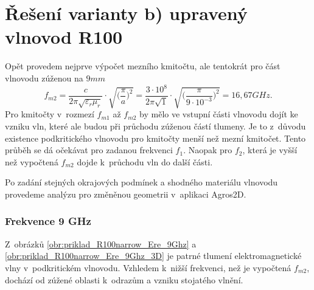 \section{Řešení varianty b) upravený vlnovod R100}
Opět provedem nejprve výpočet mezního kmitočtu, ale tentokrát pro část vlnovodu zúženou na $9\unit{mm}$
\begin{displaymath}
f_{m2} = \frac{c}{2\pi\sqrt{\varepsilon_{r}\mu_{r}}}\cdot\sqrt{\bigg(\frac{\pi}{a}\bigg)^{2}} = \frac{3\cdot 10^{8}}{2\pi\sqrt{1}}\cdot\sqrt{\bigg(\frac{\pi}{9\cdot 10^{-3}}\bigg)^{2}} = 16,67 \unit{GHz}.
\end{displaymath}
Pro kmitočty v~rozmezí $f_{m1}$ až $f_{m2}$ by mělo ve vstupní části vlnovodu dojít ke vzniku vln, které ale budou při průchodu zúženou částí tlumeny. Je to z~důvodu existence  podkritického vlnovodu pro kmitočty menší než mezní kmitočet. Tento průběh se dá očekávat pro zadanou frekvenci $f_1$. Naopak pro $f_2$, která je vyšší než vypočtená $f_{m2}$ dojde k~průchodu vln do další části.

Po zadání stejných okrajových podmínek a shodného materiálu vlnovodu provedeme analýzu pro změněnou geometrii v~aplikaci Agros2D.

\subsubsection*{Frekvence 9 GHz}
Z~obrázků \ref{obr:priklad_R100narrow_Ere_9Ghz} a \ref{obr:priklad_R100narrow_Ere_9Ghz_3D} je patrné tlumení elektromagnetické vlny v~podkritickém vlnovodu. Vzhledem k~nižší frekvenci, než je vypočtená $f_{m2}$, dochází od zúžené oblasti k~odrazům a vzniku stojatého vlnění.

